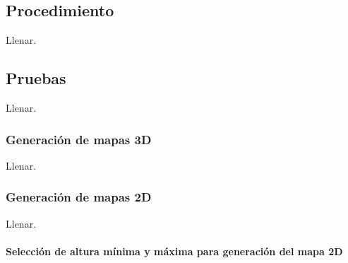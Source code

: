 \subsection{Procedimiento}

Llenar.

\subsection{Pruebas}

Llenar.

\subsubsection{Generación de mapas 3D}

Llenar.

\subsubsection{Generación de mapas 2D}

Llenar.

\paragraph{Selección de altura mínima y máxima para generación del mapa 2D}
